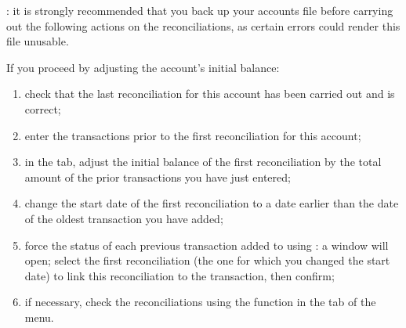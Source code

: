 \Attention{}: it is strongly recommended that you back up your accounts file before carrying out the following actions on the reconciliations, as certain errors could render this file unusable.

If you proceed by adjusting the account’s initial balance:
\begin{enumerate}
	\item check that the last reconciliation for this account has been carried out and is correct;
	\item enter the transactions prior to the first reconciliation for this account;
	\item in the  tab, adjust the initial balance of the first reconciliation by the total amount of the prior transactions you have just entered;
	\item change the start date of the first reconciliation to a date earlier than the date of the oldest transaction you have added;
	\item force the status of each previous transaction added to  using : a window will open; select the first reconciliation (the one for which you changed the start date) to link this reconciliation to the transaction, then confirm; 
	\item if necessary, check the reconciliations using the  function in the  tab of the  menu.
\end{enumerate}

